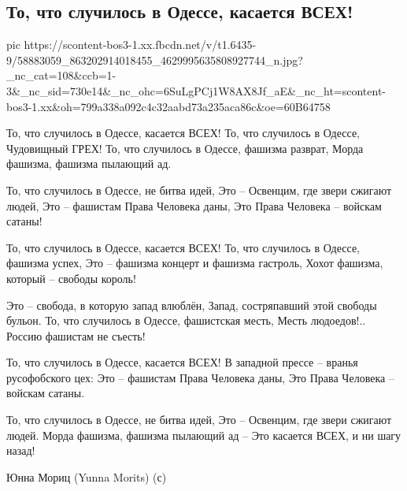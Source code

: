  
 
 
 
 

\subsection{То, что случилось в Одессе, касается ВСЕХ!}
\label{sec:01_05_2019.fb.berdnik_miroslava.1.odessa}

\ifcmt
  pic https://scontent-bos3-1.xx.fbcdn.net/v/t1.6435-9/58883059_863202914018455_4629995635808927744_n.jpg?_nc_cat=108&ccb=1-3&_nc_sid=730e14&_nc_ohc=6SuLgPCj1W8AX8Jf_aE&_nc_ht=scontent-bos3-1.xx&oh=799a338a092c4c32aabd73a235aca86c&oe=60B64758
\fi

То, что случилось в Одессе, касается ВСЕХ!
То, что случилось в Одессе, Чудовищный ГРЕХ!
То, что случилось в Одессе, фашизма разврат,
Морда фашизма, фашизма пылающий ад.

То, что случилось в Одессе, не битва идей,
Это – Освенцим, где звери сжигают людей,
Это – фашистам Права Человека даны,
Это Права Человека – войскам сатаны!

То, что случилось в Одессе, касается ВСЕХ!
То, что случилось в Одессе, фашизма успех,
Это – фашизма концерт и фашизма гастроль,
Хохот фашизма, который – свободы король!

Это – свобода, в которую запад влюблён,
Запад, состряпавший этой свободы бульон.
То, что случилось в Одессе, фашистская месть,
Месть людоедов!.. Россию фашистам не съесть!

То, что случилось в Одессе, касается ВСЕХ!
В западной прессе – вранья русофобского цех:
Это – фашистам Права Человека даны,
Это Права Человека – войскам сатаны.

То, что случилось в Одессе, не битва идей,
Это – Освенцим, где звери сжигают людей.
Морда фашизма, фашизма пылающий ад –
Это касается ВСЕХ, и ни шагу назад!

Юнна Мориц (Yunna Morits) (с)
